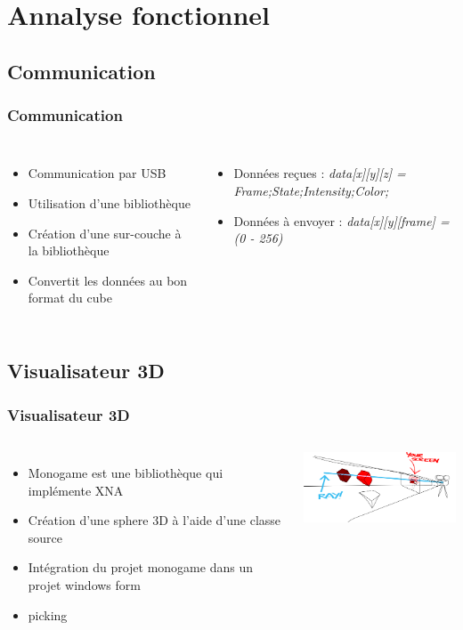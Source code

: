 \documentclass[aspectratio=169]{beamer} %
\begin{document}
	\section{Annalyse fonctionnel}
	\subsection{Communication}
	\begin{frame}
		\frametitle{Communication}
		\begin{columns}[c]
			\begin{itemize}
				\item Communication par USB
				\item Utilisation d'une bibliothèque
				\item Création d'une sur-couche à la bibliothèque
				\item Convertit les données au bon format du cube
			\end{itemize}
			
			\begin{itemize}
				\item Données reçues : \emph{data[x][y][z] = Frame;State;Intensity;Color;}
				\item Données à envoyer : \emph{data[x][y][frame] = (0 - 256)}
			\end{itemize}
			
		\end{columns}
	\end{frame}

	\subsection{Visualisateur 3D}
	\begin{frame}
		\frametitle{Visualisateur 3D}
		\begin{columns}[c]
			\column{.5\textwidth}
			\begin{itemize}
				\item Monogame est une bibliothèque qui implémente XNA
				\item Création d'une sphere 3D à l'aide d'une classe source 
				\item Intégration du projet monogame dans un projet windows form
				\item picking
			\end{itemize}
			
			\column{.5\textwidth}	
			\begin{itemize}[htp]
				\centering
				\includegraphics[width=6cm]{Img/ray.png}
			\end{itemize}
		
		\end{columns}
	\end{frame}
\end{document}
